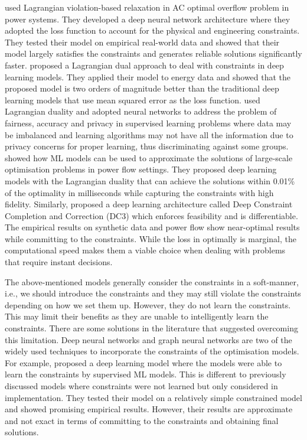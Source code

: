 \documentclass[graybox]{svmult}
\begin{document}
\citet{Fioretto:ECML20} used Lagrangian violation-based relaxation in AC optimal overflow problem in power systems. They developed a deep neural network architecture where they adopted the loss function to account for the physical and engineering constraints. They tested their model on empirical real-world data and showed that their model largely satisfies the constraints and generates reliable solutions significantly faster. \citet{fioretto2020lagrangian} proposed a  Lagrangian dual approach to deal with constraints in deep learning models.  They applied their model to energy data and showed that the proposed model is two orders of magnitude better than the traditional deep learning models that use mean squared error as the loss function. \citet{tran2021differentially} used Lagrangian duality and adopted neural networks to address the problem of fairness, accuracy and privacy in supervised learning problems where data may be imbalanced and learning algorithms may not have all the information due to privacy concerns for proper learning, thus discriminating against some groups.  \citet{chatzos2020high} showed how ML models can be used to approximate the solutions of large-scale optimisation problems in power flow settings. They proposed deep learning models with the Lagrangian duality that can achieve the solutions within 0.01\% of the optimality in milliseconds while capturing the constraints with high fidelity. Similarly, \citet{donti2021dc3} proposed a deep learning architecture called Deep Constraint Completion and Correction (DC3) which enforces feasibility and is differentiable. The empirical results on synthetic data and power flow show near-optimal results while committing to the constraints. While the loss in optimally is marginal, the computational speed makes them a viable choice when dealing with problems that require instant decisions. 


The above-mentioned models generally consider the constraints in a soft-manner, i.e., we should introduce the constraints and they may still violate the constraints depending on how we set them up. However, they do not learn the constraints. This may limit their benefits as they are unable to intelligently learn the constraints. There are some solutions in the literature that suggested overcoming this limitation. Deep neural networks and graph neural networks are two of the widely used techniques to incorporate the constraints of the optimisation models. For example, \citet{detassis2021teaching} proposed a deep learning model where the models were able to learn the constraints by supervised ML models. This is different to previously discussed models where constraints were not learned but only considered in implementation. They tested their model on a relatively simple constrained model and showed promising empirical results. However, their results are approximate and not exact in terms of committing to the constraints and obtaining final solutions. 
\end{document}
